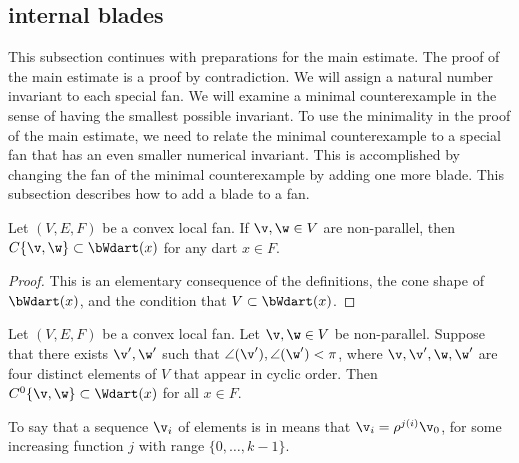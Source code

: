 \subsection{internal blades}

This subsection continues with preparations for the main estimate.
The proof of the main estimate is a proof by contradiction.  We will
assign a natural number invariant to each special fan.  We will
examine a minimal counterexample in the sense of having the smallest
possible invariant.  To use the minimality in the proof of the main
estimate, we need to relate the minimal counterexample to a special
fan that has an even smaller numerical invariant. This is accomplished
by changing the fan of the minimal counterexample by adding one more
blade.  This subsection describes how to add a blade to a fan.



\begin{lemma}[] Let $(V,E,F)$ be a convex local fan.
If $\v,\w\in V$ are non-parallel, then $C\{\v,\w\} \subset
\bWdart(x)$ for any dart $x\in F$.
\end{lemma}
%

\begin{proof} This is an elementary consequence of the definitions,
the cone shape of $\bWdart(x)$, and the condition that $V\subset
\bWdart(x)$.
\end{proof}


\begin{lemma} \label{lemma:internal}
Let $(V,E,F)$ be a convex local fan.  Let $\v,\w\in V$ be non-parallel.
Suppose that there exists $\v',\w'$ such that
$\angle(\v'),\angle(\w')<\pi$, where $\v,\v',\w,\w'$ are four
distinct elements of $V$ that appear in cyclic order.  Then
$C^0\{\v,\w\}\subset \Wdart(x)$ for all $x\in F$.
\end{lemma}
%
%
%

To say that a sequence $\v_i$ of elements is in  means that $\v_i = \rho^{j (i)}\v_0$, for some increasing
function $j$ with range $\{0,\ldots,k-1\}$.

